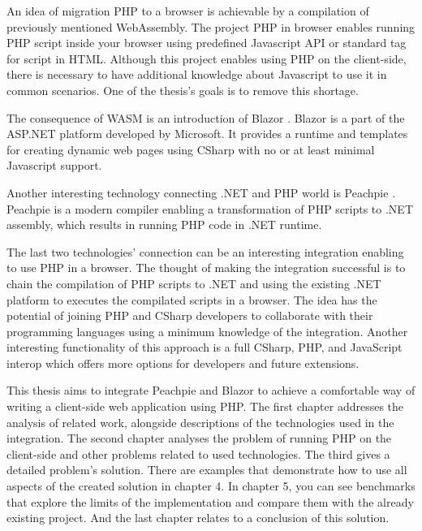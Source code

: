 An idea of migration PHP to a browser is achievable by a compilation of previously mentioned WebAssembly.
The project PHP in browser \cite{2} enables running PHP script inside your browser using predefined Javascript API or standard tag for script in HTML.
Although this project enables using PHP on the client-side, there is necessary to have additional knowledge about Javascript to use it in common scenarios.
One of the thesis's goals is to remove this shortage.

The consequence of WASM is an introduction of Blazor \cite{3}.
Blazor is a part of the ASP.NET platform developed by Microsoft.
It provides a runtime and templates for creating dynamic web pages using CSharp with no or at least minimal Javascript support.

Another interesting technology connecting .NET and PHP world is Peachpie \cite{4}.
Peachpie is a modern compiler enabling a transformation of PHP scripts to .NET assembly, which results in running PHP code in .NET runtime.

The last two technologies' connection can be an interesting integration enabling to use PHP in a browser.
The thought of making the integration successful is to chain the compilation of PHP scripts to .NET and using the existing .NET platform to executes the compilated scripts in a browser.
The idea has the potential of joining PHP and CSharp developers to collaborate with their programming languages using a minimum knowledge of the integration.
Another interesting functionality of this approach is a full CSharp, PHP, and JavaScript interop which offers more options for developers and future extensions.

This thesis aims to integrate Peachpie and Blazor to achieve a comfortable way of writing a client-side web application using PHP.
The first chapter addresses the analysis of related work, alongside descriptions of the technologies used in the integration.
The second chapter analyses the problem of running PHP on the client-side and other problems related to used technologies.
The third gives a detailed problem's solution.
There are examples that demonstrate how to use all aspects of the created solution in chapter 4.
In chapter 5, you can see benchmarks that explore the limits of the implementation and compare them with the already existing project.
And the last chapter relates to a conclusion of this solution.
